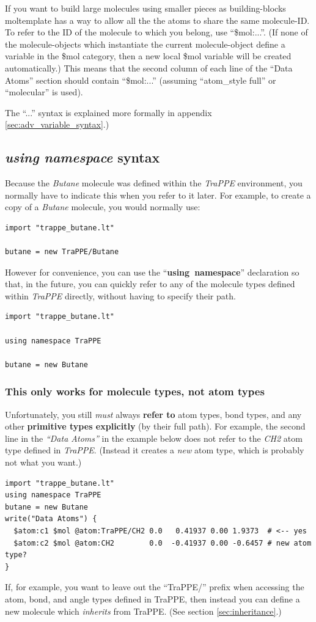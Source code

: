 \documentclass[11pt]{article}
\begin{document}
If you want to build large molecules using smaller pieces as building-blocks
moltemplate has a way to allow all the the atoms to share the same molecule-ID.
To refer to the ID of the molecule to which you belong,
use ``\$mol:...''.  (If none of the molecule-objects which 
instantiate the current molecule-object define a variable in the \$mol category,
then a new local \$mol variable will be created automatically.)
This means that the second column of each line of the ``Data Atoms'' section
should contain ``\$mol:...'' 
(assuming ``atom\_style full'' or ``molecular'' is used).

The ``...'' syntax is explained more formally 
in appendix \ref{sec:adv_variable_syntax}.)




\subsection{\textit{using namespace} syntax}
\label{sec:using_namespaces}

Because the \textit{Butane} molecule was defined within the \textit{TraPPE}
environment, you normally have to indicate this when you refer to it later.
For example, to create a copy of a \textit{Butane} molecule, 
you would normally use:
\begin{verbatim}
import "trappe_butane.lt"

butane = new TraPPE/Butane
\end{verbatim}

However for convenience, you can use the 
\mbox{``\textbf{using namespace}''} declaration 
so that, in the future, you can quickly refer to any 
of the molecule types defined within \textit{TraPPE} directly, 
without having to specify their path.
\begin{verbatim}
import "trappe_butane.lt"

using namespace TraPPE

butane = new Butane
\end{verbatim}
\subsubsection*{This only works for molecule types, not atom types}
Unfortunately, you still \textit{must} always
\textbf{refer to} atom types, bond types, and any other
\textbf{primitive types explicitly} (by their full path).
For example, the second line in the \textit{``Data Atoms''} in the example
below does not refer to the \textit{CH2} atom type defined in \textit{TraPPE}.
(Instead it creates a \textit{new} atom type, 
which is probably not what you want.)
\begin{verbatim}
import "trappe_butane.lt"
using namespace TraPPE
butane = new Butane
write("Data Atoms") {
  $atom:c1 $mol @atom:TraPPE/CH2 0.0   0.41937 0.00 1.9373  # <-- yes
  $atom:c2 $mol @atom:CH2        0.0  -0.41937 0.00 -0.6457 # new atom type?
}
\end{verbatim}
If, for example, you want to leave out the ``TraPPE/'' prefix 
when accessing the atom, bond, and angle types defined in TraPPE,
then instead you can define a new molecule which 
\textit{inherits} from TraPPE. (See section \ref{sec:inheritance}.)
\end{document}

